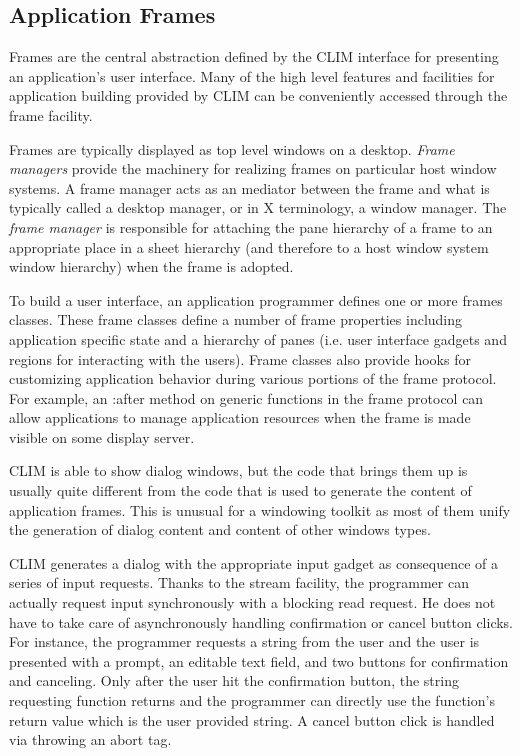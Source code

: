 \documentclass[twocolumn,a4paper]{article}
\newcommand {\concept} [1] {{\sl #1}\index{#1}}
\newcommand {\code}[1]{{\sffamily #1}}
\newcommand {\CLIM}{{\small CLIM}}
\let\keyword\code
\begin{document}
\subsection{Application Frames} Frames are the central abstraction defined by the \CLIM{} interface for presenting an application's user interface. Many of the high level features and facilities for application building provided by \CLIM{} can be conveniently accessed through the frame facility.

Frames are typically displayed as top level windows on a desktop. \concept{Frame managers} provide the machinery for realizing frames on particular host window systems. A frame manager acts as an mediator between the frame and what is typically called a desktop manager, or in X terminology, a window manager. The \concept{frame manager} is responsible for attaching the pane hierarchy of a frame to an appropriate place in a sheet hierarchy (and therefore to a host window system window hierarchy) when the frame is adopted. 

To build a user interface, an application programmer defines one or more frames classes. These frame classes define a number of frame properties including application specific state and a hierarchy of panes (i.e. user interface gadgets and regions for interacting with the users). Frame classes also provide hooks for customizing application behavior during various portions of the frame protocol. For example, an \keyword{:after} method on generic functions in the frame protocol can allow applications to manage application resources when the frame is made visible on some display server.

\CLIM{} is able to show dialog windows, but the code that brings them up is usually quite different from the code that is used to generate the content of application frames. This is unusual for a windowing toolkit as most of them unify the generation of dialog content and content of other windows types.

\CLIM{} generates a dialog with the appropriate input gadget as consequence of a series of input requests. Thanks to the stream facility, the programmer can actually request input synchronously with a blocking read request. He does not have to take care of asynchronously handling confirmation or cancel button clicks.  For instance, the programmer requests a string from the user and the user is presented with a prompt, an editable text field, and two buttons for confirmation and canceling. Only after the user hit the confirmation button, the string requesting function returns and the programmer can directly use the function's return value which is the user provided string. A cancel button click is handled via throwing an abort tag.
\end{document}
